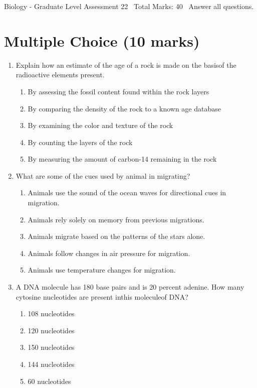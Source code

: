 \documentclass[12pt]{article}
\begin{document}
\begin{center}
Biology - Graduate Level Assessment 22 \
Total Marks: 40 \
Answer all questions.
\end{center}

\section*{Multiple Choice (10 marks)}
\begin{enumerate}[label=\arabic*.]
\item Explain how an estimate of the age of a rock is made on the basisof the radioactive elements present.
\begin{enumerate}[label=(\alph*)]
    \item By assessing the fossil content found within the rock layers
    \item By comparing the density of the rock to a known age database
    \item By examining the color and texture of the rock
    \item By counting the layers of the rock
    \item By measuring the amount of carbon-14 remaining in the rock
\end{enumerate}
\item What are some of the cues used by animal in migrating?
\begin{enumerate}[label=(\alph*)]
    \item Animals use the sound of the ocean waves for directional cues in migration.
    \item Animals rely solely on memory from previous migrations.
    \item Animals migrate based on the patterns of the stars alone.
    \item Animals follow changes in air pressure for migration.
    \item Animals use temperature changes for migration.
\end{enumerate}
\item A DNA molecule has 180 base pairs and is 20 percent adenine. How many cytosine nucleotides are present inthis moleculeof DNA?
\begin{enumerate}[label=(\alph*)]
    \item 108 nucleotides
    \item 120 nucleotides
    \item 150 nucleotides
    \item 144 nucleotides
    \item 60 nucleotides

\end{enumerate}
\end{enumerate}
\end{document}

